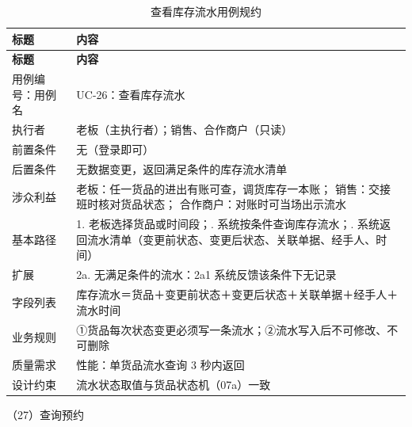 {\small
\begin{longtable}{@{}L{3.0cm} L{12.3cm}@{}}
\caption{查看库存流水用例规约}\label{tab:uc-26}\\
\toprule
\textbf{标题} & \textbf{内容} \\
\midrule
\endfirsthead
\toprule
\textbf{标题} & \textbf{内容} \\
\midrule
\endhead
用例编号：用例名 & UC-26：查看库存流水 \\
\midrule
执行者 & 老板（主执行者）；销售、合作商户（只读） \\
\midrule
前置条件 & 无（登录即可） \\
\midrule
后置条件 & 无数据变更，返回满足条件的库存流水清单 \\
\midrule
涉众利益 & 老板：任一货品的进出有账可查，调货库存一本账；\newline
销售：交接班时核对货品状态；\newline
合作商户：对账时可当场出示流水 \\
\midrule
基本路径 & 1. 老板选择货品或时间段；. 系统按条件查询库存流水；. 系统返回流水清单（变更前状态、变更后状态、关联单据、经手人、时间） \\
\midrule
扩展 & 2a. 无满足条件的流水：2a1 系统反馈该条件下无记录 \\
\midrule
字段列表 & 库存流水＝货品＋变更前状态＋变更后状态＋关联单据＋经手人＋流水时间 \\
\midrule
业务规则 & ①货品每次状态变更必须写一条流水；\newline ②流水写入后不可修改、不可删除 \\
\midrule
质量需求 & 性能：单货品流水查询 3 秒内返回 \\
\midrule
设计约束 & 流水状态取值与货品状态机（07a）一致 \\
\midrule
\bottomrule
\end{longtable}}

\noindent（27）查询预约

